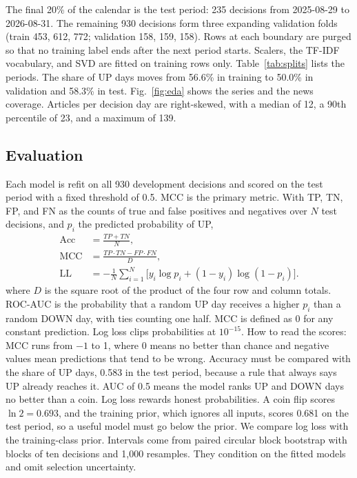 The final 20\% of the calendar is the test period: 235 decisions from 2025-08-29 to 2026-08-31. The remaining 930 decisions form three expanding validation folds (train 453, 612, 772; validation 158, 159, 158). Rows at each boundary are purged so that no training label ends after the next period starts. Scalers, the TF-IDF vocabulary, and SVD are fitted on training rows only. Table~\ref{tab:splits} lists the periods. The share of UP days moves from 56.6\% in training to 50.0\% in validation and 58.3\% in test. Fig.~\ref{fig:eda} shows the series and the news coverage. Articles per decision day are right-skewed, with a median of 12, a 90th percentile of 23, and a maximum of 139.




\subsection{Evaluation}
Each model is refit on all 930 development decisions and scored on the test period with a fixed threshold of 0.5. MCC is the primary metric. With TP, TN, FP, and FN as the counts of true and false positives and negatives over $N$ test decisions, and $p_i$ the predicted probability of UP,
\begin{align}
\mathrm{Acc} &= \frac{TP+TN}{N},\\
\mathrm{MCC} &= \frac{TP\cdot TN - FP\cdot FN}{D},\\
\mathrm{LL} &= -\frac{1}{N}\sum_{i=1}^{N}\big[y_i\log p_i + (1-y_i)\log(1-p_i)\big].
\end{align}
where $D$ is the square root of the product of the four row and column totals. ROC-AUC is the probability that a random UP day receives a higher $p_i$ than a random DOWN day, with ties counting one half. MCC is defined as 0 for any constant prediction. Log loss clips probabilities at $10^{-15}$. How to read the scores: MCC runs from $-1$ to 1, where 0 means no better than chance and negative values mean predictions that tend to be wrong. Accuracy must be compared with the share of UP days, 0.583 in the test period, because a rule that always says UP already reaches it. AUC of 0.5 means the model ranks UP and DOWN days no better than a coin. Log loss rewards honest probabilities. A coin flip scores $\ln 2=0.693$, and the training prior, which ignores all inputs, scores 0.681 on the test period, so a useful model must go below the prior. We compare log loss with the training-class prior. Intervals come from paired circular block bootstrap with blocks of ten decisions and 1{,}000 resamples. They condition on the fitted models and omit selection uncertainty.

